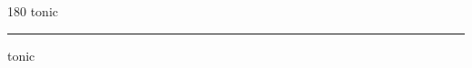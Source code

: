 
\begin{frame}
\begin{center}
\begin{turn}{180}
{\fontsize{2.5cm}{1em}\selectfont tonic}
\end{turn}
\vspace{1em}\par  
\hrule
\vspace{1em}\par  
{\fontsize{2.5cm}{1em}\selectfont tonic}
\end{center}
\end{frame}
